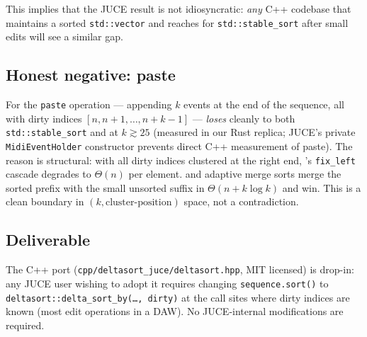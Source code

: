 This implies that the JUCE result is not idiosyncratic: \emph{any} C++
codebase that maintains a sorted \texttt{std::vector} and reaches for
\texttt{std::stable\_sort} after small edits will see a similar gap.

\subsection{Honest negative: paste}

For the \texttt{paste} operation --- appending $k$ events at the end of
the sequence, all with dirty indices $[n, n+1, \dots, n+k-1]$ ---
\DeltaSort \emph{loses} cleanly to both \texttt{std::stable\_sort} and
\ESM at $k \gtrsim 25$ (measured in our Rust replica;
JUCE's private \texttt{MidiEventHolder} constructor prevents direct C++
measurement of paste). The reason is structural: with all dirty indices
clustered at the right end, \DeltaSort's \texttt{fix\_left} cascade
degrades to $\Theta(n)$ per element. \ESM and adaptive merge sorts merge
the sorted prefix with the small unsorted suffix in $\Theta(n + k\log k)$
and win. This is a clean boundary in $(k, \text{cluster-position})$
space, not a contradiction.

\subsection{Deliverable}

The C++ port (\texttt{cpp/deltasort\_juce/deltasort.hpp}, MIT licensed) is
drop-in: any JUCE user wishing to adopt it requires changing
\texttt{sequence.sort()} to \texttt{deltasort::delta\_sort\_by(\ldots,
dirty)} at the call sites where dirty indices are known (most edit operations
in a DAW). No JUCE-internal modifications are required.
